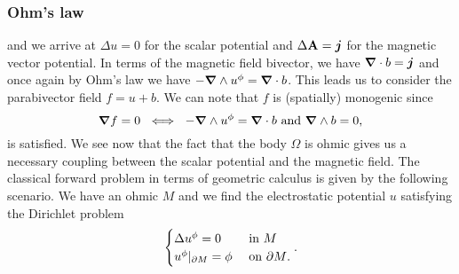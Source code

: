 \subsubsection{Ohm's law}
and we arrive at $\Delta u = 0$ for the scalar potential and $\Delta \mathbf{A} = \boldsymbol{j}$ for the magnetic vector potential. In terms of the magnetic field bivector, we have $\boldsymbol{\nabla} \cdot b = \boldsymbol{j}$ and once again by Ohm's law we have $-\boldsymbol{\nabla} \wedge u^\phi = \boldsymbol{\nabla} \cdot b$. This leads us to consider the parabivector field $f=u+b$. We can note that $f$ is (spatially) monogenic since 
\[
\boldsymbol{\nabla} f = 0 ~\iff~ -\boldsymbol{\nabla} \wedge u^\phi =  \boldsymbol{\nabla} \cdot b ~\textrm{and}~ \boldsymbol{\nabla} \wedge b = 0,
\]
is satisfied. We see now that the fact that the body $\Omega$ is ohmic gives us a necessary coupling between the scalar potential and the magnetic field.
The classical forward problem in terms of geometric calculus is given by the following scenario. We have an ohmic $M$ and we find the electrostatic potential $u$ satisfying the Dirichlet problem
\begin{equation}
\label{eq:dirichlet_problem}
\begin{cases} \Delta u^\phi = 0 & \textrm{ in $M$} \\  u^\phi \vert_{{\partial M}} = \phi & \textrm{ on ${\partial M}$}. \end{cases}.
\end{equation}



